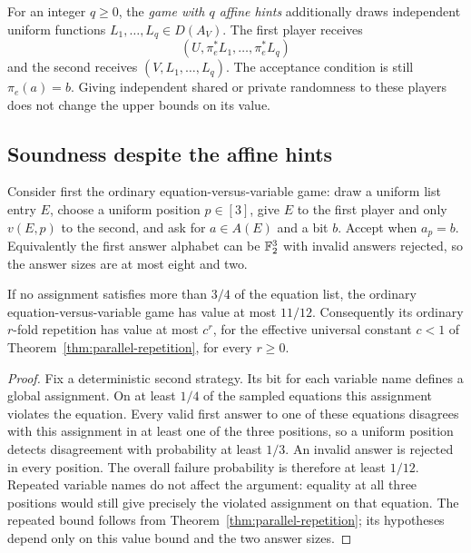 For an integer $q\ge0$, the \emph{game with $q$ affine hints} additionally
draws independent uniform functions $L_1,\ldots,L_q\in D(A_V)$. The first
player receives
\[
 (U,\pi_e^*L_1,\ldots,\pi_e^*L_q)
\]
and the second receives $(V,L_1,\ldots,L_q)$. The acceptance condition is
still $\pi_e(a)=b$. Giving independent shared or private randomness to these
players does not change the upper bounds on its value.

\subsection{Soundness despite the affine hints}

Consider first the ordinary equation-versus-variable game: draw a uniform
list entry $E$, choose a uniform position $p\in[3]$, give $E$ to the first
player and only $v(E,p)$ to the second, and ask for $a\in A(E)$ and a bit
$b$. Accept when $a_p=b$. Equivalently the first answer alphabet can be
$\mathbb F_2^3$ with invalid answers rejected, so the answer sizes are at most
eight and two.

\begin{lemma}\label{lem:base-equation-game}
If no assignment satisfies more than $3/4$ of the equation list, the
ordinary equation-versus-variable game has value at most $11/12$.
Consequently its ordinary $r$-fold repetition has value at most $c^r$, for
the effective universal constant $c<1$ of
Theorem~\ref{thm:parallel-repetition}, for every $r\ge0$.
\end{lemma}
\begin{proof}
Fix a deterministic second strategy. Its bit for each variable name defines
a global assignment. On at least $1/4$ of the sampled equations this
assignment violates the equation. Every valid first answer to one of these
equations disagrees with this assignment in at least one of the three
positions, so a uniform position detects disagreement with probability at
least $1/3$. An invalid answer is rejected in every position. The overall
failure probability is therefore at least $1/12$. Repeated variable names
do not affect the argument: equality at all three positions would still
give precisely the violated assignment on that equation. The repeated
bound follows from Theorem~\ref{thm:parallel-repetition}; its hypotheses
depend only on this value bound and the two answer sizes.
\end{proof}

